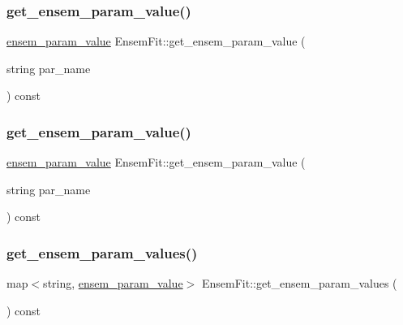 \subsubsection{\texorpdfstring{get\_ensem\_param\_value()}{get\_ensem\_param\_value()}\hspace{0.1cm}{\footnotesize\ttfamily [1/2]}}
{\footnotesize\ttfamily \mbox{\hyperlink{structensem__param__value}{ensem\+\_\+param\+\_\+value}} Ensem\+Fit\+::get\+\_\+ensem\+\_\+param\+\_\+value (\begin{DoxyParamCaption}\item[{string}]{par\+\_\+name }\end{DoxyParamCaption}) const}

\mbox{\label{classEnsemFit_afa01cceaae9172656f561cdd2d63121b}} 
\subsubsection{\texorpdfstring{get\_ensem\_param\_value()}{get\_ensem\_param\_value()}\hspace{0.1cm}{\footnotesize\ttfamily [2/2]}}
{\footnotesize\ttfamily \mbox{\hyperlink{structensem__param__value}{ensem\+\_\+param\+\_\+value}} Ensem\+Fit\+::get\+\_\+ensem\+\_\+param\+\_\+value (\begin{DoxyParamCaption}\item[{string}]{par\+\_\+name }\end{DoxyParamCaption}) const}

\mbox{\label{classEnsemFit_aefa2dcc89aad7c209fac39ebba06372a}} 
\subsubsection{\texorpdfstring{get\_ensem\_param\_values()}{get\_ensem\_param\_values()}\hspace{0.1cm}{\footnotesize\ttfamily [1/2]}}
{\footnotesize\ttfamily map$<$string, \mbox{\hyperlink{structensem__param__value}{ensem\+\_\+param\+\_\+value}}$>$ Ensem\+Fit\+::get\+\_\+ensem\+\_\+param\+\_\+values (\begin{DoxyParamCaption}{ }\end{DoxyParamCaption}) const\hspace{0.3cm}{\ttfamily [inline]}}


